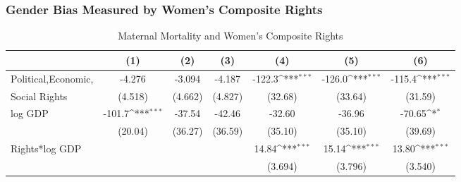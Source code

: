 \documentclass[10pt,letterpaper,subeqn]{beamer}
\begin{document}
\begin{frame}
\frametitle{Gender Bias Measured by Women's Composite Rights}
\begin{table}[htbp]\centering
\def\sym#1{\ifmmode^{#1}\else\(^{#1}\)\fi}
\scriptsize
\caption{Maternal Mortality and Women's Composite Rights \label{MMRWRight3}}
\begin{tabular}{l*{6}{c}}
\hline\hline
            &\multicolumn{1}{c}{(1)}&\multicolumn{1}{c}{(2)}&\multicolumn{1}{c}{(3)}&\multicolumn{1}{c}{(4)}&\multicolumn{1}{c}{(5)}&\multicolumn{1}{c}{(6)}\\
\hline
\multicolumn{1}{p{2cm}}{Political,Economic, }       &      -4.276         &      -3.094         &      -4.187         &      -122.3\sym{***}&      -126.0\sym{***}&      -115.4\sym{***}\\
  Social Rights          &     (4.518)         &     (4.662)         &     (4.827)         &     (32.68)         &     (33.64)         &     (31.59)         \\

log GDP        &      -101.7\sym{***}&      -37.54         &      -42.46         &      -32.60         &      -36.96         &      -70.65\sym{*}  \\
            &     (20.04)         &     (36.27)         &     (36.59)         &     (35.10)         &     (35.10)         &     (39.69)         \\


Rights*log GDP    &                     &                     &                     &       14.84\sym{***}&       15.14\sym{***}&       13.80\sym{***}\\
            &                     &                     &                     &     (3.694)         &     (3.796)         &     (3.540)         \\



\end{tabular}
\end{table}
\end{frame}
\end{document}
